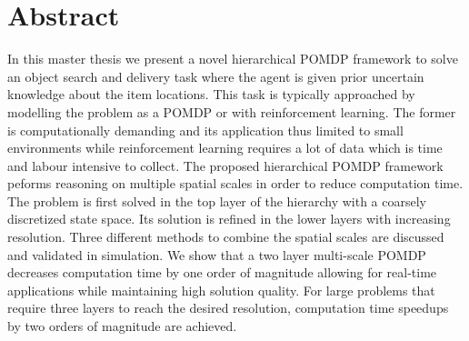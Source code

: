 \chapter*{Abstract}




In this master thesis we present a novel hierarchical POMDP framework to solve an object search and delivery task where the agent is given prior uncertain knowledge about the item locations. 
This task is typically approached by modelling the problem as a POMDP or with reinforcement learning. The former is computationally demanding and its application thus limited to small environments while reinforcement learning requires a lot of data which is time and labour intensive to collect. The proposed hierarchical POMDP framework peforms reasoning on multiple spatial scales in order to reduce computation time. 
The problem is first solved in the top layer of the hierarchy with a coarsely discretized state space. Its solution is refined in the lower layers with increasing resolution. Three different methods to combine the spatial scales are discussed and validated in simulation. We show that a two layer multi-scale POMDP decreases computation time by one order of magnitude allowing for real-time applications while maintaining high solution quality. For large problems that require three layers to reach the desired resolution, computation time speedups by two orders of magnitude are achieved.
